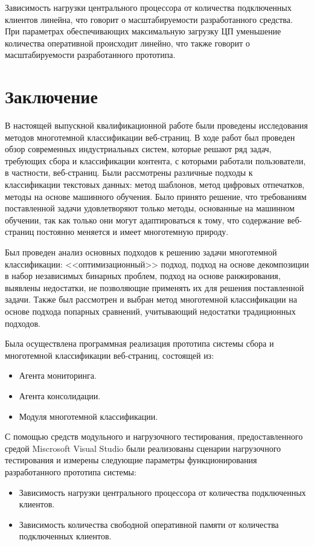 \documentclass[russian, utf8, emptystyle]{eskdtext}
\begin{document}
Зависимость нагрузки центрального процессора от количества подключенных клиентов линейна, что говорит о масштабируемости разработанного средства. При параметрах обеспечивающих максимальную загрузку ЦП уменьшение количества оперативной происходит линейно, что также говорит о масштабируемости разработанного прототипа.


\section {Заключение}
В настоящей выпускной квалификационной работе были проведены исследования методов многотемной классификации веб-страниц. В ходе работ был проведен обзор современных индустриальных систем, которые решают ряд задач, требующих сбора и классификации контента, с которыми работали пользователи, в частности, веб-страниц. Были рассмотрены различные подходы к классификации текстовых данных: метод шаблонов, метод цифровых отпечатков, методы на основе машинного обучения. Было принято решение, что требованиям поставленной задачи удовлетворяют только методы, основанные на машинном обучении, так как только они могут адаптироваться к тому, что содержание веб-страниц постоянно меняется и имеет многотемную природу. 

Был проведен анализ основных подходов к решению задачи многотемной классификации: <<оптимизационный>> подход, подход на основе декомпозиции в набор независимых бинарных проблем, подход на основе ранжирования, выявлены недостатки, не позволяющие применять их для решения поставленной задачи. Также был рассмотрен и выбран метод многотемной классификации на основе подхода попарных сравнений, учитывающий недостатки традиционных подходов.



Была осуществлена программная реализация прототипа системы сбора и многотемной классификации веб-страниц, состоящей из:
\begin{itemize}
	\item Агента мониторинга.
	\item Агента консолидации.
	\item Модуля многотемной классификации.
\end{itemize}

С помощью средств модульного и нагрузочного тестирования, предоставленного средой Miscrosoft Visual Studio были реализованы сценарии нагрузочного тестирования и измерены следующие параметры функционирования разработанного прототипа системы:
\begin{itemize}
	\item Зависимость нагрузки центрального процессора от количества подключенных клиентов.
	\item Зависимость количества свободной оперативной памяти от количества подключенных клиентов.
\end{itemize}
\end{document}
